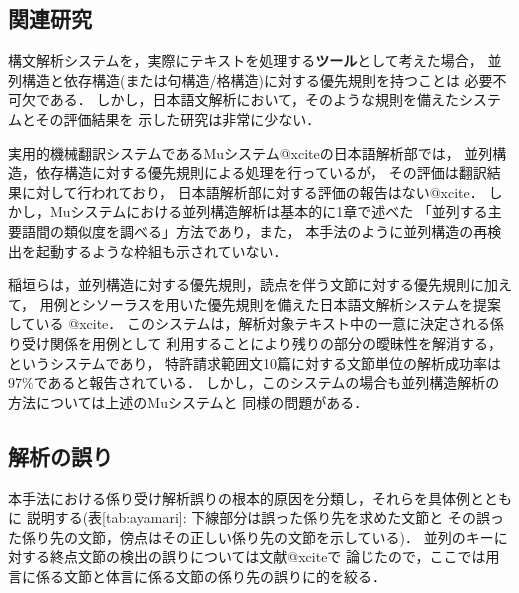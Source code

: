 \subsection{関連研究}

構文解析システムを，実際にテキストを処理する{\bf ツール}として考えた場合，
並列構造と依存構造(または句構造/格構造)に対する優先規則を持つことは
必要不可欠である．
しかし，日本語文解析において，そのような規則を備えたシステムとその評価結果を
示した研究は非常に少ない．

実用的機械翻訳システムであるMuシステム@xciteの日本語解析部では，
並列構造，依存構造に対する優先規則による処理を行っているが，
その評価は翻訳結果に対して行われており，
日本語解析部に対する評価の報告はない@xcite．
しかし，Muシステムにおける並列構造解析は基本的に1章で述べた
「並列する主要語間の類似度を調べる」方法であり，また，
本手法のように並列構造の再検出を起動するような枠組も示されていない．

稲垣らは，並列構造に対する優先規則，読点を伴う文節に対する優先規則に加えて，
用例とシソーラスを用いた優先規則を備えた日本語文解析システムを提案している
@xcite．
このシステムは，解析対象テキスト中の一意に決定される係り受け関係を用例として
利用することにより残りの部分の曖昧性を解消する，というシステムであり，
特許請求範囲文10篇に対する文節単位の解析成功率は97\%であると報告されている．
しかし，このシステムの場合も並列構造解析の方法については上述のMuシステムと
同様の問題がある．



{\unitlength=1mm
}

\subsection{解析の誤り}

本手法における係り受け解析誤りの根本的原因を分類し，それらを具体例とともに
説明する(表[tab:ayamari]: 下線部分は誤った係り先を求めた文節と
その誤った係り先の文節，傍点はその正しい係り先の文節を示している)．
並列のキーに対する終点文節の検出の誤りについては文献@xciteで
論じたので，ここでは用言に係る文節と体言に係る文節の係り先の誤りに的を絞る．

